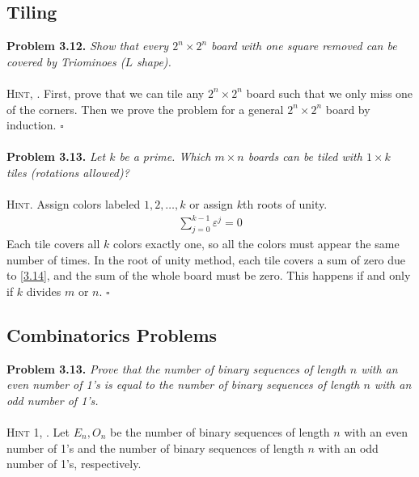 \documentclass[a4paper,oneside]{article}
\numberwithin{equation}{section}
\begin{document}
\subsection{Tiling}
\textbf{Problem 3.12.} \textit{Show that every $2^n\times 2^n$ board with one square removed can be covered by Triominoes ($L$ shape).}\\
\\
\textsc{Hint, \cite{7}.} First, prove that we can tile any $2^n \times 2^n$ board such that we only miss one of the corners. Then we prove the problem for a general $2^n\times 2^n$ board by induction. \hfill $\square$\\
\\
\textbf{Problem 3.13.} \textit{Let $k$ be a prime. Which $m\times n$ boards can be tiled with $1\times  k$ tiles (rotations allowed)?}\\
\\
\textsc{Hint.} Assign colors labeled $1,2,\ldots,k$ or assign $k$th roots of unity.
\begin{align}
\label{3.14}
\sum\limits_{j = 0}^{k - 1} {{\varepsilon ^j}}  = 0
\end{align}
Each tile covers all $k$  colors exactly one, so all the colors must  appear the same number of times. In the root of unity method, each tile covers a sum of zero due to \eqref{3.14}, and the sum of the whole board must be zero. This happens  if and only if $k$ divides $m$ or $n$. \hfill $\square$

\subsection{Combinatorics Problems}
\textbf{Problem 3.13.} \textit{Prove that the number of binary sequences of length $n$ with an even number of 1's is equal to the number of binary sequences of length $n$ with an odd number of 1's.}\\
\\
\textsc{Hint 1, \cite{7}.} Let $E_n, O_n$ be the number of binary sequences of length $n$ with an even number of 1's and the number of binary sequences of length $n$ with an odd number of 1's, respectively. 
\end{document}

